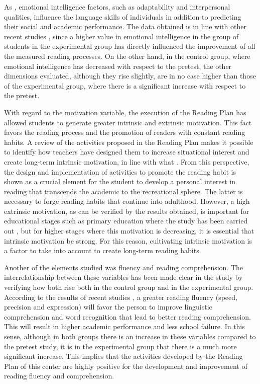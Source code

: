 \documentclass[english]{textolivre}
\begin{document}
As \textcite{perpina_marti_does_2020}, emotional intelligence factors, such as adaptability and interpersonal qualities, influence the language skills of individuals in addition to predicting their social and academic performance. The data obtained is in line with other recent studies \cite{ramos-navas-parejo_uso_2020}, since a higher value in emotional intelligence in the group of students in the experimental group has directly influenced the improvement of all the measured reading processes. On the other hand, in the control group, where emotional intelligence has decreased with respect to the pretest, the other dimensions evaluated, although they rise slightly, are in no case higher than those of the experimental group, where there is a significant increase with respect to the pretest.

With regard to the motivation variable, the execution of the Reading Plan has allowed students to generate greater intrinsic and extrinsic motivation. This fact favors the reading process and the promotion of readers with constant reading habits. A review of the activities proposed in the Reading Plan makes it possible to identify how teachers have designed them to increase situational interest and create long-term intrinsic motivation, in line with what \textcite{guthrie_influences_2006}. From this perspective, the design and implementation of activities to promote the reading habit is shown as a crucial element for the student to develop a personal interest in reading that transcends the academic to the recreational sphere. The latter is necessary to forge reading habits that continue into adulthood. However, a high extrinsic motivation, as can be verified by the results obtained, is important for educational stages such as primary education where the study has been carried out \cite{pearson2017}, but for higher stages where this motivation is decreasing, it is essential that intrinsic motivation be strong. For this reason, cultivating intrinsic motivation is a factor to take into account to create long-term reading habits. 

Another of the elements studied was fluency and reading comprehension. The interrelationship between these variables has been made clear in the study by verifying how both rise both in the control group and in the experimental group. According to the results of recent studies \cite{alvarez-canizo_reading_2020}, a greater reading fluency (speed, precision and expression) will favor the person to improve linguistic comprehension and word recognition that lead to better reading comprehension. This will result in higher academic performance and less school failure. In this sense, although in both groups there is an increase in these variables compared to the pretest study, it is in the experimental group that there is a much more significant increase. This implies that the activities developed by the Reading Plan of this center are highly positive for the development and improvement of reading fluency and comprehension.
\end{document}
